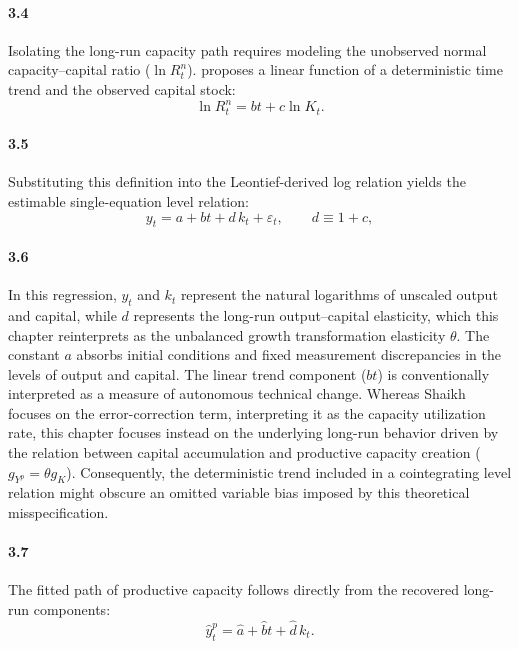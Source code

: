\paragraph{3.4}
Isolating the long-run capacity path requires modeling the unobserved normal capacity--capital ratio ($\ln R^n_t$). \citet{Shaikh2016} proposes a linear function of a deterministic time trend and the observed capital stock:
\begin{equation}
\ln R^n_t = bt + c \ln K_t.
\end{equation}

\paragraph{3.5}
Substituting this definition into the Leontief-derived log relation yields the estimable single-equation level relation:
\begin{equation}
y_t = a + bt + d\,k_t + \varepsilon_t,
\qquad d \equiv 1+c,
\end{equation}

\paragraph{3.6}
In this regression, $y_t$ and $k_t$ represent the natural logarithms of unscaled output and capital, while $d$ represents the long-run output--capital elasticity, which this chapter reinterprets as the unbalanced growth transformation elasticity $\theta$. The constant $a$ absorbs initial conditions and fixed measurement discrepancies in the levels of output and capital. The linear trend component ($bt$) is conventionally interpreted as a measure of autonomous technical change. Whereas Shaikh focuses on the error-correction term, interpreting it as the capacity utilization rate, this chapter focuses instead on the underlying long-run behavior driven by the relation between capital accumulation and productive capacity creation ($g_{Y^p} = \theta g_K$). Consequently, the deterministic trend included in a cointegrating level relation might obscure an omitted variable bias imposed by this theoretical misspecification.

\paragraph{3.7}
The fitted path of productive capacity follows directly from the recovered long-run components:
\begin{equation}
\hat{y}^p_t = \hat{a} + \hat{b}t + \hat{d}\,k_t.
\end{equation}

